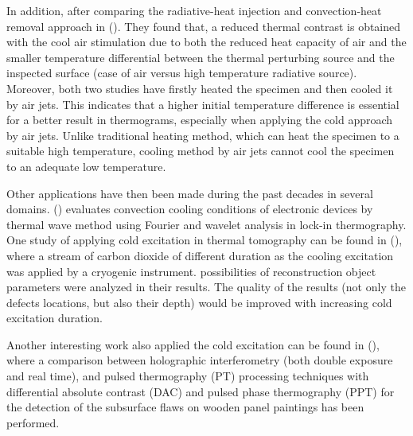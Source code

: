 In addition, after comparing  the radiative-heat injection and convection-heat removal approach in (\citet{Maldague1993Nondestructive}). They found that, a reduced thermal contrast is obtained with the cool air stimulation due to both the reduced heat capacity of air and the smaller temperature differential between the thermal perturbing source and the inspected surface (case of air versus high temperature radiative source).  Moreover, both two studies have firstly heated the specimen and then cooled it by air jets. This indicates that a higher initial temperature difference is essential for a better result in thermograms, especially when applying the cold approach by air jets. Unlike traditional heating method, which can heat the specimen to a suitable high temperature, cooling method by air jets cannot cool the specimen to an adequate low temperature. 


Other applications have then been made during the past decades in several domains. (\citet{Swiatczak2008Evaluation}) evaluates convection cooling conditions of electronic devices by thermal wave method using Fourier and wavelet analysis in lock-in thermography. One study of applying cold excitation in thermal tomography can be found in (\citet{Bajorek2010Analysis}), where a stream of carbon dioxide of different duration as the cooling excitation was applied by a cryogenic instrument. possibilities of reconstruction object parameters were analyzed in their results. The quality of the results (not only the defects locations, but also their depth) would be improved with increasing cold excitation duration.

Another interesting work also applied the cold excitation can be found in (\citet{Ibarra-Castanedo2010Diagnostics}), where a comparison between holographic interferometry (both double exposure and real time), and pulsed thermography (PT) processing techniques with differential absolute contrast (DAC) and pulsed phase thermography (PPT) for the detection of the subsurface flaws on wooden panel paintings has been performed.


